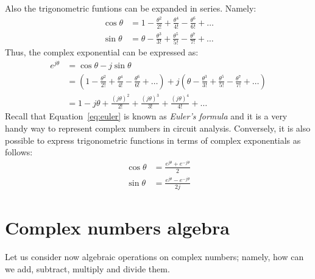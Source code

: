 Also the trigonometric funtions can be expanded in series. Namely:
\begin{equation}
\begin{split}
\cos\theta &= 1 - \frac{\theta^2}{2!} + \frac{\theta^4}{4!} -\frac{\theta^6}{6!} + \ldots\\
\sin\theta &= \theta - \frac{\theta^3}{3!} + \frac{\theta^5}{5!} - \frac{\theta^7}{7!} + \ldots 
\end{split}
\end{equation}
Thus, the complex exponential can be expressed as:
\begin{equation}
\label{eq:euler}
\begin{split}
e^{j\theta} &= \cos\theta -j\sin\theta\\ 
            &= \left(1 - \frac{\theta^2}{2!} + \frac{\theta^4}{4!} -\frac{\theta^6}{6!} + \ldots\right) +j\left(\theta - \frac{\theta^3}{3!} + \frac{\theta^5}{5!} - \frac{\theta^7}{7!} + \ldots\right)\\
            &= 1 -j\theta + \frac{(j\theta)^2}{2!} +
               \frac{(j\theta)^3}{3!} + \frac{(j\theta)^4}{4!} + \ldots
\end{split}
\end{equation}
Recall that Equation~\ref{eq:euler} is known as \emph{Euler's formula} and it is a very handy way to represent complex numbers in circuit analysis. Conversely, it is also possible to express trigonometric functions in terms of complex exponentials as follows:
\begin{equation}
\begin{split}
\cos\theta &= \frac{e^{j\theta}+e^{-j\theta}}{2}\\
\sin\theta &= \frac{e^{j\theta}-e^{-j\theta}}{2j}
\end{split}
\end{equation}

\section{Complex numbers algebra}
Let us consider now algebraic operations on complex numbers; namely, how can we add, subtract, multiply and divide them.

